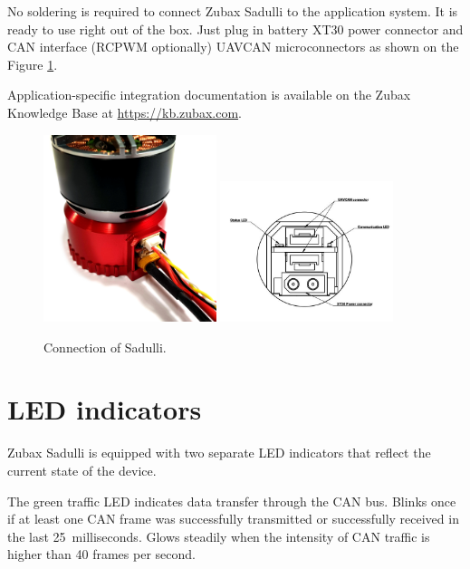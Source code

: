 \documentclass{zubaxdoc}
\begin{document}
No soldering is required to connect Zubax Sadulli to the application system. 
It is ready to use right out of the box. Just plug in battery XT30 power connector and CAN interface (RCPWM optionally) UAVCAN microconnectors as shown on the Figure \ref{Sadulli_connectors}. 

Application-specific integration documentation is available on the Zubax Knowledge Base at
\mbox{\url{https://kb.zubax.com}}.

\begin{figure}[hb]
    \includegraphics[width=0.45\textwidth]{sadulli-connectors} \includegraphics[width=0.45\textwidth]{connectors}
	\caption{Connection of Sadulli.
	\label{Sadulli_connectors}}
\end{figure}


\section{LED indicators}

\newcommand{\LEDX}{{\rule{0.4em}{1.0em}}}
\newcommand{\LEDO}{{\rule{0.4em}{0.1em}}}

\newcommand{\ShowColor}[1]{{\color{#1}\rule{2em}{0.8em}}}

Zubax Sadulli is equipped with two separate LED indicators that reflect the current state of the device.

The green traffic LED indicates data transfer through the CAN bus. Blinks once if at least one CAN frame was successfully transmitted or successfully received in the last 25~milliseconds. Glows steadily when the intensity of CAN traffic is higher than 40 frames per second.
\end{document}
